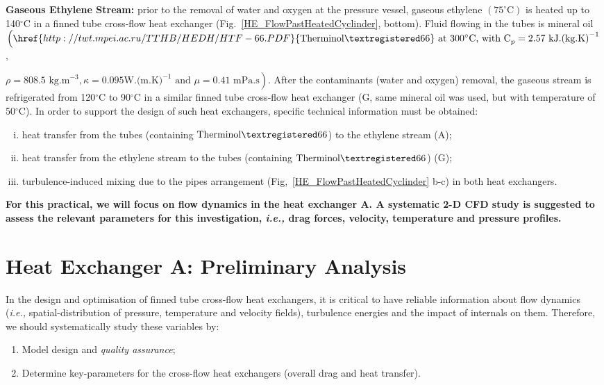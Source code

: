 \documentclass[12pts,a4paper,amsmath,amssymb,floatfix]{article}%
\newcommand{\ie}{{\it i.e., }}
\begin{document}
{\bf Gaseous Ethylene Stream:} prior to the removal of water and oxygen at the pressure vessel, gaseous ethylene $\left(\text{75}^{\circ}\text{C}\right)$ is heated up to 140$^{\circ}$C in a finned tube cross-flow heat exchanger (Fig.~\ref{HE_FlowPastHeatedCyclinder}, bottom). Fluid flowing in the tubes is mineral oil $\left(\href{http://twt.mpei.ac.ru/TTHB/HEDH/HTF-66.PDF}{\text{Therminol}\textregistered\text{66}} \text{ at 300}^{\circ}\text{C, with C}_{p}=2.57\text{ kJ.(kg.K)}^{-1}\right.$,

$\left.\rho= 808.5\text{ kg.m}^{-3}, \kappa=0.095\text{W.(m.K)}^{-1}\text{ and }\mu=0.41\text{ mPa.s}\right)$. After the contaminants (water and oxygen) removal, the gaseous stream is refrigerated from 120$^{\circ}$C to 90$^{\circ}$C in a similar finned tube cross-flow heat exchanger (G, same mineral oil was used, but with temperature of 50$^{\circ}$C).  In order to support the design of such heat exchangers, specific technical information must be obtained:
     \begin{enumerate}[i)]
        \item heat transfer from the tubes (containing $\text{Therminol}\textregistered\text{66}$) to the ethylene stream (A);
        \item heat transfer from the ethylene stream to the tubes (containing $\text{Therminol}\textregistered\text{66}$) (G);
        \item turbulence-induced mixing due to the pipes arrangement (Fig,~\ref{HE_FlowPastHeatedCyclinder} b-c) in both heat exchangers.
     \end{enumerate}

     {\bf For this practical, we will focus on flow dynamics in the heat exchanger A. A systematic 2-D CFD study is suggested to assess the relevant parameters for this investigation, \ie drag forces, velocity, temperature and pressure profiles.}

     \section{Heat Exchanger A: Preliminary Analysis }
     In the design and optimisation of finned tube cross-flow heat exchangers, it is critical to have reliable information about flow dynamics (\ie spatial-distribution of pressure, temperature and velocity fields), turbulence energies and the impact of internals on them. Therefore, we should systematically study these variables by:
     \begin{enumerate}
       \item Model design and {\it quality assurance};
       \item Determine key-parameters for the cross-flow heat exchangers (overall drag and heat transfer).
     \end{enumerate}
\end{document}
